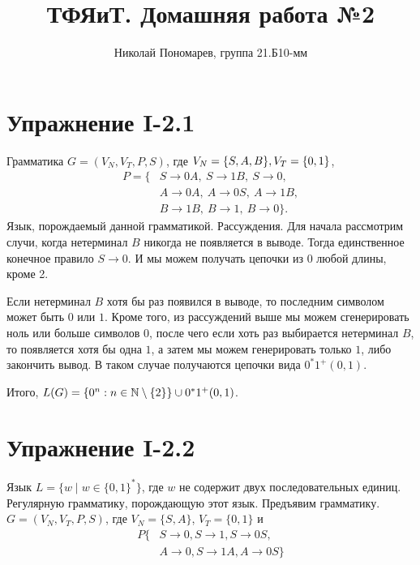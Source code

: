\documentclass[12pt, oneside]{memoir}
\title{ТФЯиТ. Домашняя работа №2}
\author{Николай Пономарев, группа 21.Б10-мм}
\begin{document}
\maketitle

\section*{Упражнение I-2.1}

\begin{solution}
    {Грамматика $G = (V_N, V_T, P, S)$, где $V_N = \{S, A, B\}, \\ V_T = \{0, 1\}$,
        \begin{align*}
            P = \{
             & S \to 0A, \   S \to 1B, \   S \to 0,    \\
             & A \to 0A,\    A \to 0S,\    A \to 1B,   \\
             & B\to 1B, \    B\to 1,   \    B\to 0 \}.
        \end{align*}
    }
    {Язык, порождаемый данной грамматикой.}
    {Рассуждения.}
    Для начала рассмотрим случи, когда нетерминал $B$ никогда не появляется в выводе.
    Тогда единственное конечное правило $S \to 0$.
    И мы можем получать цепочки из $0$ любой длины, кроме 2.

    Если нетерминал $B$ хотя бы раз появился в выводе, то последним символом может быть $0$ или $1$.
    Кроме того, из рассуждений выше мы можем сгенерировать ноль или больше символов $0$, после чего если хоть раз выбирается нетерминал $B$, то появляется хотя бы одна $1$, а затем мы можем генерировать только $1$, либо закончить вывод.
    В таком случае получаются цепочки вида $0^* 1^+ (0,1)$.

    Итого, $L(G) = \{0^n : n \in \mathbb{N} \setminus \{2\}\} \cup 0^* 1^+ (0,1)$.
\end{solution}


\section*{Упражнение I-2.2}
\begin{solution}
    {Язык $L = \{w \mid w \in \{0,1\}^* \}$, где $w$ не содержит двух последовательных единиц.}
    {Регулярную грамматику, порождающую этот язык.}
    {Предъявим грамматику.}
    $G = (V_N, V_T, P, S)$, где $V_N = \{S, A\}$, $V_T =\{0, 1\}$ и
    \begin{align*}
        P \{ & S \to 0, S \to 1, S \to 0S,   \\
             & A \to 0, S \to 1A, A \to 0S\}
    \end{align*}
\end{solution}
\end{document}
